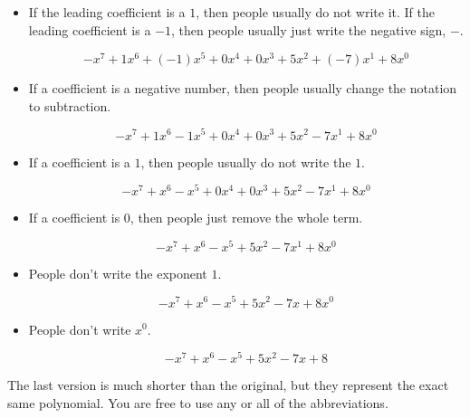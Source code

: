 \documentclass{ximera}
\begin{document}
\begin{itemize}
\item If the leading coefficient is a $1$, then people usually do not write it. If the leading coefficient is a $-1$, then people usually just write the negative sign, $-$.


\[  -x^7 + 1 x^6 + (-1) x^5 + 0 x^4 + 0 x^3 + 5 x^2 + (-7) x^1 + 8 x^0              \]


\item If a coefficient is a negative number, then people usually change the notation to subtraction.


\[  -x^7 + 1 x^6 - 1 x^5 + 0 x^4 + 0 x^3 + 5 x^2 - 7 x^1 + 8 x^0              \]



\item If a coefficient is a $1$, then people usually do not write the $1$.


\[  -x^7 + x^6 - x^5 + 0 x^4 + 0 x^3 + 5 x^2 - 7 x^1 + 8 x^0              \]


\item If a coefficient is $0$, then people just remove the whole term.

\[  -x^7 + x^6 - x^5 + 5 x^2 - 7 x^1 + 8 x^0              \]


\item People don't write the exponent $1$.

\[  -x^7 + x^6 - x^5 + 5 x^2 - 7 x + 8 x^0              \]



\item People don't write $x^0$.

\[  -x^7 + x^6 - x^5 + 5 x^2 - 7 x + 8             \]




\end{itemize}




The last version is much shorter than the original, but they represent the exact same polynomial. You are free to use any or all of the abbreviations.\\
\end{document}
